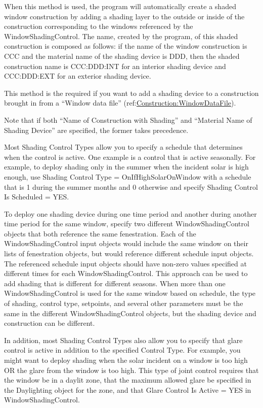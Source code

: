 \begin{itemize}
When this method is used, the program will automatically create a shaded window construction by adding a shading layer to the outside or inside of the construction corresponding to the windows referenced by the WindowShadingControl. The name, created by the program, of this shaded construction is composed as follows: if the name of the window construction is CCC and the material name of the shading device is DDD, then the shaded construction name is CCC:DDD:INT for an interior shading device and CCC:DDD:EXT for an exterior shading device.

This method is the required if you want to add a shading device to a construction brought in from a ``Window data file'' (ref:\hyperref[constructionwindowdatafile]{Construction:WindowDataFile}).

Note that if both ``Name of Construction with Shading'' and ``Material Name of Shading Device'' are specified, the former takes precedence.
\end{itemize}

Most Shading Control Types allow you to specify a schedule that determines when the control is active. One example is a control that is active seasonally. For example, to deploy shading only in the summer when the incident solar is high enough, use Shading Control Type = OnIfHighSolarOnWindow with a schedule that is 1 during the summer months and 0 otherwise and specify Shading Control Is Scheduled = YES.

To deploy one shading device during one time period and another during another time period for the same window, specify two different WindowShadingControl objects that both reference the same fenestration.  Each of the WindowShadingControl input objects would include the same window on their lists of fenestration objects, but would reference different schedule input objects. The referenced schedule input objects should have non-zero values specified at different times for each WindowShadingControl. This approach can be used to add shading that is different for different seasons. When more than one WindowShadingControl is used for the same window based on schedule, the type of shading, control type, setpoints, and several other parameters must be the same in the different WindowShadingControl objects, but the shading device and construction can be different.

In addition, most Shading Control Types also allow you to specify that glare control is active in addition to the specified Control Type. For example, you might want to deploy shading when the solar incident on a window is too high OR the glare from the window is too high. This type of joint control requires that the window be in a daylit zone, that the maximum allowed glare be specified in the Daylighting object for the zone, and that Glare Control Is Active = YES in WindowShadingControl.

